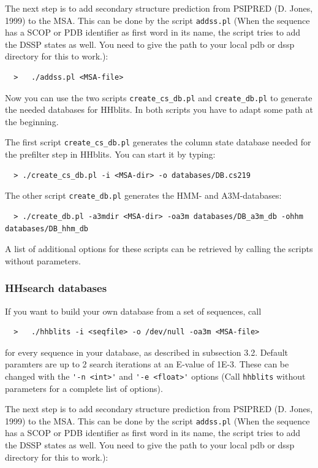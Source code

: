 \documentclass[11pt,a4paper]{article}
\begin{document}
The next step is to add secondary structure prediction from PSIPRED (D. Jones, 1999) to the
MSA. This can be done by the script \verb`addss.pl` (When the sequence has a SCOP or PDB identifier as first word 
in its name, the script tries to add the DSSP states as well. You need to give the 
path to your local pdb or dssp directory for this to work.):

\begin{verbatim}
  >   ./addss.pl <MSA-file>
\end{verbatim}

Now you can use the two scripts \verb`create_cs_db.pl` and \verb`create_db.pl` to generate the
needed databases for HHblits. In both scripts you have to adapt some path at the beginning.

The first script \verb`create_cs_db.pl` generates the column state database needed for the 
prefilter step in HHblits. You can start it by typing:

\begin{verbatim}
  > ./create_cs_db.pl -i <MSA-dir> -o databases/DB.cs219
\end{verbatim}

The other script \verb`create_db.pl` generates the HMM- and A3M-databases:

\begin{verbatim}
  > ./create_db.pl -a3mdir <MSA-dir> -oa3m databases/DB_a3m_db -ohhm databases/DB_hhm_db
\end{verbatim}

A list of additional options for these scripts can be retrieved by calling the scripts without 
parameters.

\subsubsection{HHsearch databases}

If you want to build your own database from a set of sequences, call 
\begin{verbatim}
  >   ./hhblits -i <seqfile> -o /dev/null -oa3m <MSA-file>
\end{verbatim}

for every sequence in your database, as described in subsection 3.2. Default paramters 
are up to 2 search iterations at an E-value of 1E-3. These can be changed with the 
\verb`'-n <int>'` and \verb`'-e <float>'` options (Call \verb`hhblits` without parameters for a 
complete list of options). 

The next step is to add secondary structure prediction from PSIPRED (D. Jones, 1999) to the
MSA. This can be done by the script \verb`addss.pl` (When the sequence has a SCOP or PDB identifier as first word 
in its name, the script tries to add the DSSP states as well. You need to give the 
path to your local pdb or dssp directory for this to work.):
\end{document}
